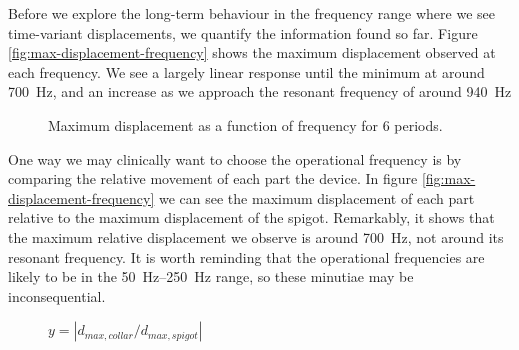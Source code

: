 Before we explore the long-term behaviour in the frequency range where we see time-variant displacements, we quantify the information found so far.
Figure \ref{fig:max-displacement-frequency} shows the maximum displacement observed at each frequency.
We see a largely linear response until the minimum at around \SI{700}{Hz}, and an increase as we approach the resonant frequency of around \SI{940}{Hz}
\begin{figure}[h]\centering

\caption{Maximum displacement as a function of frequency for 6 periods.}
\label{fig:max-displacement-6}
\end{figure}

One way we may clinically want to choose the operational frequency is by comparing the relative movement of each part the device.
In figure \ref{fig:max-displacement-frequency} we can see the maximum displacement of each part relative to the maximum displacement of the spigot.
Remarkably, it shows that the maximum relative displacement we observe is around \SI{700}{Hz}, not around its resonant frequency.
It is worth reminding that the operational frequencies are likely to be in the \SIrange{50}{250}{Hz} range, so these minutiae may be inconsequential.  


\begin{figure}[h] \centering
{}
\caption{$y = |d_{max,collar}/d_{max, spigot}|$}
\label{fig:normalisation}
\end{figure}
